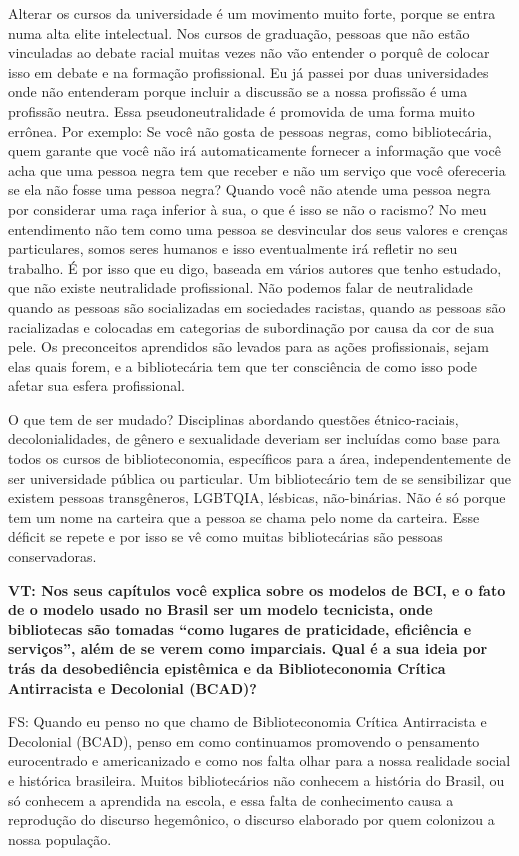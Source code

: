 \documentclass[a4paper,
fontsize=11pt,
oneside,
numbers=noperiodatend,
parskip=half-,
bibliography=totoc,
final
]{scrartcl}
\begin{document}
Alterar os cursos da universidade é um movimento muito forte, porque se
entra numa alta elite intelectual. Nos cursos de graduação, pessoas que
não estão vinculadas ao debate racial muitas vezes não vão entender o
porquê de colocar isso em debate e na formação profissional. Eu já
passei por duas universidades onde não entenderam porque incluir a
discussão se a nossa profissão é uma profissão neutra. Essa
pseudoneutralidade é promovida de uma forma muito errônea. Por exemplo:
Se você não gosta de pessoas negras, como bibliotecária, quem garante
que você não irá automaticamente fornecer a informação que você acha que
uma pessoa negra tem que receber e não um serviço que você ofereceria se
ela não fosse uma pessoa negra? Quando você não atende uma pessoa negra
por considerar uma raça inferior à sua, o que é isso se não o racismo?
No meu entendimento não tem como uma pessoa se desvincular dos seus
valores e crenças particulares, somos seres humanos e isso eventualmente
irá refletir no seu trabalho. É por isso que eu digo, baseada em vários
autores que tenho estudado, que não existe neutralidade profissional.
Não podemos falar de neutralidade quando as pessoas são socializadas em
sociedades racistas, quando as pessoas são racializadas e colocadas em
categorias de subordinação por causa da cor de sua pele. Os preconceitos
aprendidos são levados para as ações profissionais, sejam elas quais
forem, e a bibliotecária tem que ter consciência de como isso pode
afetar sua esfera profissional.

O que tem de ser mudado? Disciplinas abordando questões étnico-raciais,
decolonialidades, de gênero e sexualidade deveriam ser incluídas como
base para todos os cursos de biblioteconomia, específicos para a área,
independentemente de ser universidade pública ou particular. Um
bibliotecário tem de se sensibilizar que existem pessoas transgêneros,
LGBTQIA, lésbicas, não-binárias. Não é só porque tem um nome na carteira
que a pessoa se chama pelo nome da carteira. Esse déficit se repete e
por isso se vê como muitas bibliotecárias são pessoas conservadoras.

\textbf{VT: Nos seus capítulos você explica sobre os modelos de BCI, e o
fato de o modelo usado no Brasil ser um modelo tecnicista, onde
bibliotecas são tomadas \enquote{como lugares de praticidade, eficiência
e serviços}, além de se verem como imparciais. Qual é a sua ideia por
trás da desobediência epistêmica e da Biblioteconomia Crítica
Antirracista e Decolonial (BCAD)?}

FS: Quando eu penso no que chamo de Biblioteconomia Crítica Antirracista
e Decolonial (BCAD), penso em como continuamos promovendo o pensamento
eurocentrado e americanizado e como nos falta olhar para a nossa
realidade social e histórica brasileira. Muitos bibliotecários não
conhecem a história do Brasil, ou só conhecem a aprendida na escola, e
essa falta de conhecimento causa a reprodução do discurso hegemônico, o
discurso elaborado por quem colonizou a nossa população.
\end{document}
